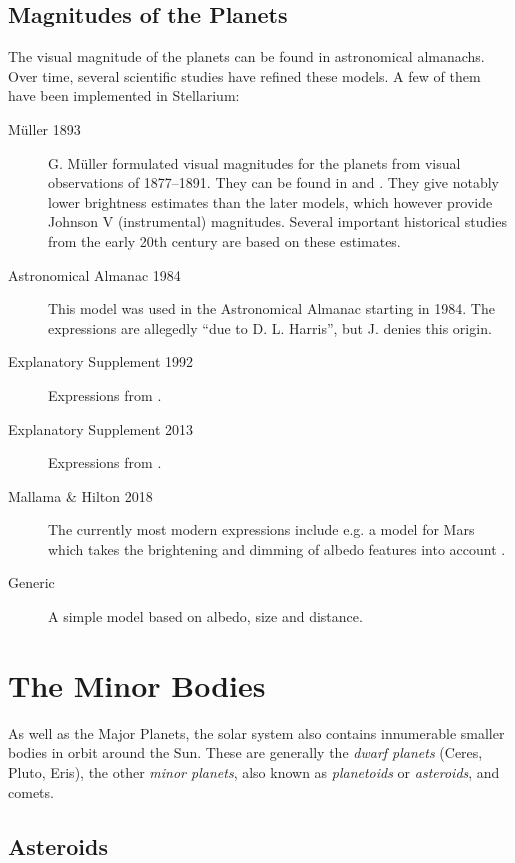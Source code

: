 \subsection{Magnitudes of the Planets}
The visual magnitude of the planets can be found in astronomical
almanachs. Over time, several scientific studies have refined these
models. A few of them have been implemented in Stellarium:
\begin{description}
\item[Müller 1893] G. Müller formulated visual magnitudes for the
  planets from visual observations of 1877--1891. They can be found in
  \citet{AstronomicalAlgorithms:1998} and \citet{ESAE:1961}. They give 
  notably lower brightness estimates than the later models, which however 
  provide Johnson V (instrumental) magnitudes. Several important 
  historical studies from the early 20th century are based on these estimates.
\item[Astronomical Almanac 1984] This model was used in the
  Astronomical Almanac starting in 1984. The expressions are allegedly
  ``due to D. L.  Harris'', but J.
  \citet[p.286]{AstronomicalAlgorithms:1998} denies this origin. 
\item[Explanatory Supplement 1992] Expressions from \citet{ESAA:1992}.
\item[Explanatory Supplement 2013] Expressions from \citet{ESAA:2013}.
\item[Mallama \& Hilton 2018] The currently most modern expressions
  include e.g. a model for Mars which takes the brightening and
  dimming of albedo features into account \citep{Mallama:2018}.
\item[Generic] A simple model based on albedo, size and distance.
\end{description}

\section{The Minor Bodies}%

As well as the Major Planets, the solar system also contains
innumerable smaller bodies in orbit around the Sun. These are
generally the \emph{dwarf planets} (Ceres, Pluto, Eris), the other
\emph{minor planets}, also known as \emph{planetoids} or
\emph{asteroids}, and comets.

\subsection{Asteroids}
\label{sec:Phenomena:Asteroids}

